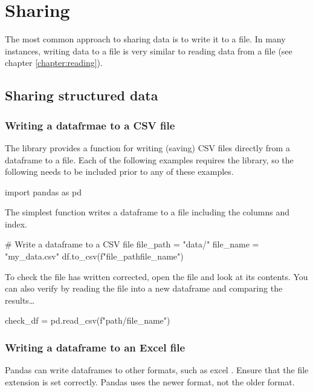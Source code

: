 \chapter{Sharing}
\label{chapter:sharing}

The most common approach to sharing data is to write it to a file. In many instances, writing data to a file is very similar to reading data from a file (see chapter \ref{chapter:reading}).

\section{Sharing structured data}

\subsection{Writing a datafrmae to a CSV file}

The  library provides a function for writing (saving) CSV files directly from a dataframe to a file. Each of the following examples requires the library, so the following  needs to be included prior to any of these examples.

\begin{pycode}
    import pandas as pd
\end{pycode}

The simplest  function writes a dataframe to a file including the columns and index.

\begin{pycode}
    # Write a dataframe to a CSV file
    file_path = "data/"
    file_name = "my_data.csv"
    df.to_csv(f"{file_path}{file_name}")
\end{pycode}

To check the file has written corrected, open the file and look at its contents. You can also verify by reading the file into a new dataframe and comparing the results\dots

\begin{pycode}
    check_df = pd.read_csv(f"{path}/{file_name}")
\end{pycode}

\subsection{Writing a dataframe to an Excel file}

Pandas can write dataframes to other formats, such as excel . Ensure that the file extension is set correctly. Pandas uses the newer  format, not the older  format.

